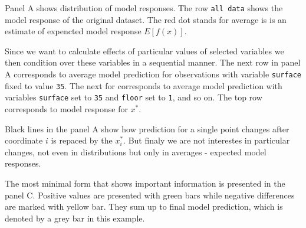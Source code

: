 \documentclass[]{krantz}
\theoremstyle{definition}
\theoremstyle{definition}
\theoremstyle{definition}
\theoremstyle{remark}
\begin{document}
Panel A shows distribution of model responses. The row
\texttt{all\ data} shows the model response of the original dataset. The
red dot stands for average is is an estimate of expencted model response
\(E [f(x)]\).

Since we want to calculate effects of particular values of selected
variables we then condition over these variables in a sequential manner.
The next row in panel A corresponds to average model prediction for
observations with variable \texttt{surface} fixed to value \texttt{35}.
The next for corresponds to average model prediction with variables
\texttt{surface} set to \texttt{35} and \texttt{floor} set to
\texttt{1}, and so on. The top row corresponds to model response for
\(x^*\).

Black lines in the panel A show how prediction for a single point
changes after coordinate \(i\) is repaced by the \(x^*_i\). But finaly
we are not interestes in particular changes, not even in distributions
but only in averages - expected model responses.

The most minimal form that shows important information is presented in
the panel C. Positive values are presented with green bars while
negative differences are marked with yellow bar. They sum up to final
model prediction, which is denoted by a grey bar in this example.
\end{document}
